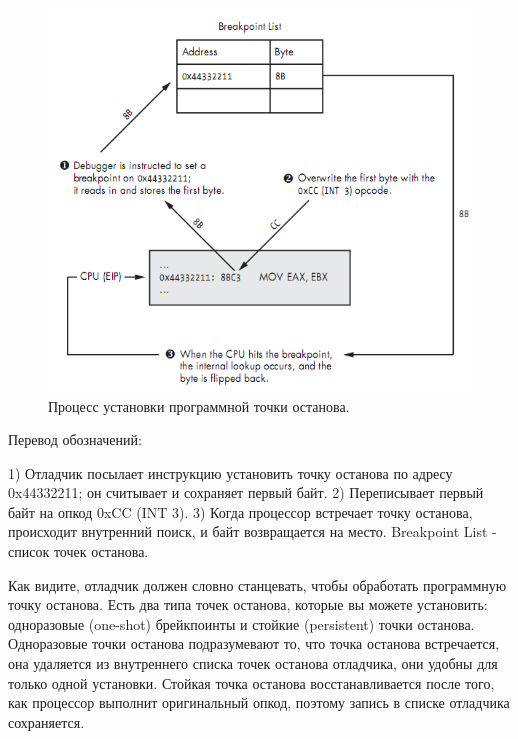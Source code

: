 \documentclass[12pt]{book}
\begin{document}
\begin{figure}
  \center
  \includegraphics{./pic/chap2/3.PNG}
  \caption{Процесс установки программной точки останова.}
\end{figure}

Перевод обозначений:

     1) Отладчик посылает инструкцию установить точку останова по адресу 0x44332211; он считывает и сохраняет первый байт.
     2) Переписывает первый байт на опкод 0xCC (INT 3).
     3) Когда процессор встречает точку останова, происходит внутренний поиск, и байт возвращается на место.
     Breakpoint List - список точек останова.


Как видите, отладчик должен словно станцевать, чтобы обработать программную точку останова. Есть два типа точек останова, которые вы можете установить: одноразовые (one-shot) брейкпоинты и стойкие (persistent) точки останова. Одноразовые точки останова подразумевают то, что точка останова встречается, она удаляется из внутреннего списка точек останова отладчика, они удобны для только одной установки. Стойкая точка останова восстанавливается после того, как процессор выполнит оригинальный опкод, поэтому запись в списке отладчика сохраняется.
\end{document}
